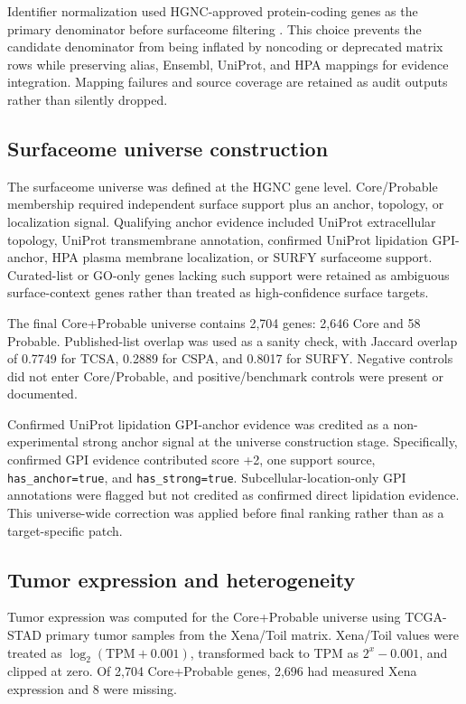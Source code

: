 \documentclass[review,12pt,authoryear]{elsarticle}
\begin{document}
Identifier normalization used HGNC-approved protein-coding genes as the primary denominator before surfaceome filtering \citep{tweedie2021hgnc}. This choice prevents the candidate denominator from being inflated by noncoding or deprecated matrix rows while preserving alias, Ensembl, UniProt, and HPA mappings for evidence integration. Mapping failures and source coverage are retained as audit outputs rather than silently dropped.

\subsection{Surfaceome universe construction}

The surfaceome universe was defined at the HGNC gene level. Core/\allowbreak{}Probable membership required independent surface support plus an anchor, topology, or localization signal. Qualifying anchor evidence included UniProt extracellular topology, UniProt transmembrane annotation, confirmed UniProt lipidation GPI-anchor, HPA plasma membrane localization, or SURFY surfaceome support. Curated-list or GO-only genes lacking such support were retained as ambiguous surface-context genes rather than treated as high-confidence surface targets.

The final Core+\allowbreak{}Probable universe contains 2,704 genes: 2,646 Core and 58 Probable. Published-list overlap was used as a sanity check, with Jaccard overlap of 0.7749 for TCSA, 0.2889 for CSPA, and 0.8017 for SURFY. Negative controls did not enter Core/\allowbreak{}Probable, and positive/\allowbreak{}benchmark controls were present or documented.

Confirmed UniProt lipidation GPI-anchor evidence was credited as a non-experimental strong anchor signal at the universe construction stage. Specifically, confirmed GPI evidence contributed score +\allowbreak{}2, one support source, \texttt{has\_\allowbreak{}anchor=true}, and \texttt{has\_\allowbreak{}strong=true}. Subcellular-location-only GPI annotations were flagged but not credited as confirmed direct lipidation evidence. This universe-wide correction was applied before final ranking rather than as a target-specific patch.

\subsection{Tumor expression and heterogeneity}

Tumor expression was computed for the Core+\allowbreak{}Probable universe using TCGA-STAD primary tumor samples from the Xena/\allowbreak{}Toil matrix. Xena/\allowbreak{}Toil values were treated as $\log_2(\mathrm{TPM}+0.001)$, transformed back to TPM as $2^{x} - 0.001$, and clipped at zero. Of 2,704 Core+\allowbreak{}Probable genes, 2,696 had measured Xena expression and 8 were missing.
\end{document}
